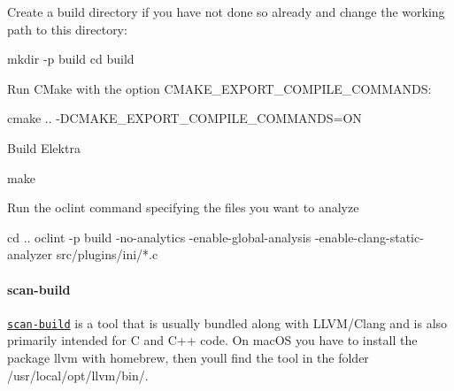 \begin{DoxyEnumerate}
\item Create a build directory if you have not done so already and change the working path to this directory\+:
\end{DoxyEnumerate}


\begin{DoxyCode}
mkdir -p build
cd build
\end{DoxyCode}



\begin{DoxyEnumerate}
\item Run C\+Make with the option {\ttfamily C\+M\+A\+K\+E\+\_\+\+E\+X\+P\+O\+R\+T\+\_\+\+C\+O\+M\+P\+I\+L\+E\+\_\+\+C\+O\+M\+M\+A\+N\+DS}\+:
\end{DoxyEnumerate}


\begin{DoxyCode}
cmake .. -DCMAKE\_EXPORT\_COMPILE\_COMMANDS=ON
\end{DoxyCode}



\begin{DoxyEnumerate}
\item Build Elektra
\end{DoxyEnumerate}


\begin{DoxyCode}
make
\end{DoxyCode}



\begin{DoxyEnumerate}
\item Run the {\ttfamily oclint} command specifying the files you want to analyze
\end{DoxyEnumerate}


\begin{DoxyCode}
cd ..
oclint -p build -no-analytics -enable-global-analysis -enable-clang-static-analyzer src/plugins/ini/*.c
\end{DoxyCode}


\paragraph*{scan-\/build}

\href{http://clang-analyzer.llvm.org/scan-build.html}{\tt scan-\/build} is a tool that is usually bundled along with L\+L\+V\+M/\+Clang and is also primarily intended for C and C++ code. On mac\+OS you have to install the package {\ttfamily llvm} with homebrew, then you\textquotesingle{}ll find the tool in the folder {\ttfamily /usr/local/opt/llvm/bin/}.

